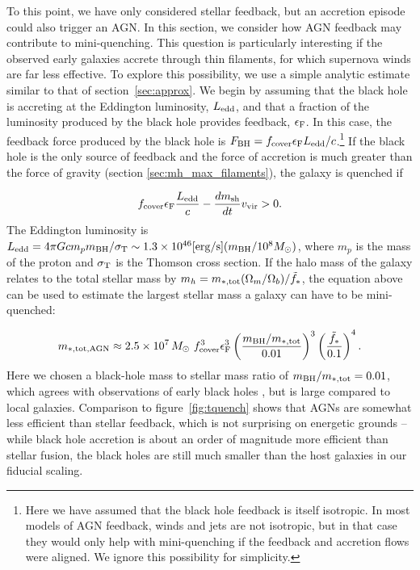 \documentclass[a4paper,11pt]{article}
\begin{document}
To this point, we have only considered stellar feedback, but an accretion episode could also trigger an AGN. In this section, we consider how AGN feedback may contribute to mini-quenching. This question is particularly interesting if the observed early galaxies accrete through thin filaments, for which supernova winds are far less effective. To explore this possibility, we use a simple analytic estimate similar to that of section~\ref{sec:approx}. We begin by assuming that the black hole is accreting at the Eddington luminosity, $L_{\rm edd}$, and that a fraction of the luminosity produced by the black hole provides feedback, $\epsilon_{\rm F}$. In this case, the feedback force produced by the black hole is $F_{\rm BH} = f_{\rm cover} \epsilon_{\rm F} L_{\rm edd} / c$.\footnote{Here we have assumed that the black hole feedback is itself isotropic. In most models of AGN feedback, winds and jets are not isotropic, but in that case they would only help with mini-quenching if the feedback and accretion flows were aligned. We ignore this possibility for simplicity.} If the black hole is the only source of feedback and the force of accretion is much greater than the force of gravity (section \ref{sec:mh_max_filaments}), the galaxy is quenched if

\begin{equation}
    f_{\rm cover} \epsilon_{\rm F} \frac{L_{\rm edd}}{c} - \frac{dm_{\rm sh}}{dt} v_{\rm vir} > 0.
\end{equation}
%
The Eddington luminosity is $L_{\rm edd} = 4 \pi G c m_{p} m_{\rm BH} / \sigma_{\rm T} \sim 1.3 \times 10^{46} \mathrm{[erg/s]} (m_{\rm BH}/10^{8} M_{\odot})$, where $m_{p}$ is the mass of the proton and $\sigma_{\rm T}$ is the Thomson cross section. If the halo mass of the galaxy relates to the total stellar mass by $m_{h} = m_{*, \rm tot}(\Omega_{m}/\Omega_{b}) / \tilde{f}_{*}$, the equation above can be used to estimate the largest stellar mass a galaxy can have to be mini-quenched:

\begin{equation}
    m_{*, \rm tot, AGN} \approx 2.5 \times 10^7 \,  M_{\odot} \ f_{\rm cover}^{3} \epsilon_{\rm F}^3 \left( \frac{m_{\rm BH} / m_{*, \rm tot}}{0.01} \right)^{3} \left( \frac{\tilde{f}_{*}}{0.1} \right)^{4}.
    \label{eq:mtot_AGN} 
\end{equation}
%
Here we chosen a black-hole mass to stellar mass ratio of $m_{\rm BH}/m_{*, \rm tot} = 0.01$, which agrees with observations of early black holes \cite{Harikane2023_AGN, Pacucci2023_Mbh-Mstar, Juodvbalis2025_AGN}, but is large compared to local galaxies. Comparison to figure~\ref{fig:tquench} shows that AGNs are somewhat less efficient than stellar feedback, which is not surprising on energetic grounds -- while black hole accretion is about an order of magnitude more efficient than stellar fusion, the black holes are still much smaller than the host galaxies in our fiducial scaling.  
\end{document}
